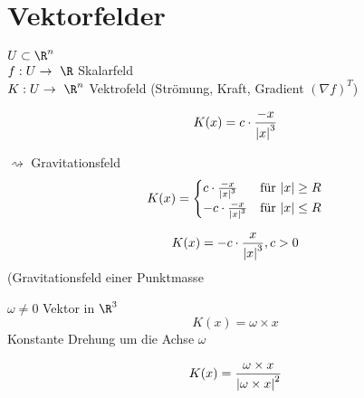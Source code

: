 \chapter{Vektorfelder}
$U \subset \R^n$ \\
$f: U \rightarrow \R$ Skalarfeld \\
$K: U \rightarrow \R^n$ Vektrofeld (Strömung, Kraft, Gradient $(\nabla f)^T$)
\begin{bsp*}[note = konstantes Vektorfeld]
\end{bsp*}
\begin{bsp}[note = Punktmasse]
	\[ K(x) = c \cdot \frac{-x}{\abs{x}^3} \]
\end{bsp}
\begin{bsp}[note = Homogene Kugel mit Radius $R$]
	$\rightsquigarrow$ Gravitationsfeld
	\[ K(x) = \begin{cases}
		c \cdot \frac{-x}{\abs{x}^3} &\text{für } \abs{x} \geq R \\
		-c \cdot \frac{-x}{\abs{x}^3} &\text{für } \abs{x} \leq R
	\end{cases} \]
\end{bsp}
\begin{bsp}
	\[ K(x) = -c \cdot \frac{x}{\abs{x}^3} , c > 0 \]
	(Gravitationsfeld einer Punktmasse
\end{bsp}
\begin{bsp}
	$\omega \neq 0$ Vektor in $\R^3$
	\[ K(x) = \omega \times x \]
	Konstante Drehung um die Achse $\omega$
\end{bsp}
\begin{bsp}
	\[ K(x) = \frac{\omega \times x}{\abs{\omega \times x}^2} \]
\end{bsp}

